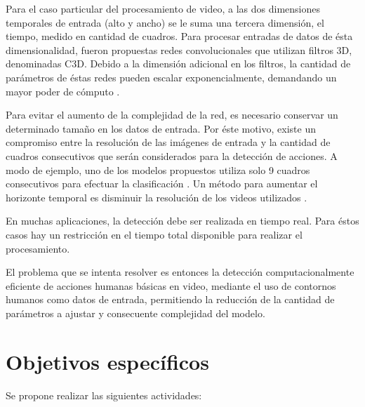 \documentclass[10pt]{article}
\begin{document}
Para el caso particular del procesamiento de video, a las dos dimensiones temporales de entrada (alto y ancho) se le suma una tercera dimensión, el tiempo, medido en cantidad de cuadros. Para procesar entradas de datos de ésta dimensionalidad, fueron propuestas redes convolucionales que utilizan filtros 3D, denominadas C3D. Debido a la dimensión adicional en los filtros, la cantidad de parámetros de éstas redes pueden escalar exponencialmente, demandando un mayor poder de cómputo \citep{Li2019}.

Para evitar el aumento de la complejidad de la red, es necesario conservar un determinado tamaño en los datos de entrada. Por éste motivo, existe un compromiso entre la resolución de las imágenes de entrada y la cantidad de cuadros consecutivos que serán considerados para la detección de acciones. A modo de ejemplo, uno de los modelos propuestos utiliza solo 9 cuadros consecutivos para efectuar la clasificación \citep{Ji2013}. Un método para aumentar el horizonte temporal es disminuir la resolución de los videos utilizados \citep{Asadi-Aghbolaghi2017}.

En muchas aplicaciones, la detección debe ser realizada en tiempo real. Para éstos casos hay un restricción en el tiempo total disponible para realizar el procesamiento. 

El problema que se intenta resolver es entonces la detección computacionalmente eficiente de acciones humanas básicas en video, mediante el uso de contornos humanos como datos de entrada, permitiendo la reducción de la cantidad de parámetros a ajustar y consecuente complejidad del modelo.

\section{Objetivos específicos}

Se propone realizar las siguientes actividades: 
\end{document}
